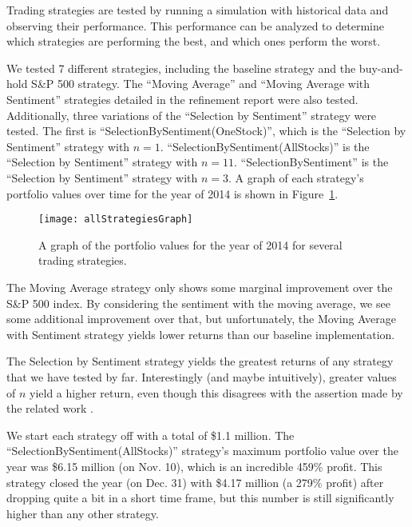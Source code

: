 Trading strategies are tested by running a simulation with historical data and observing their performance.
This performance can be analyzed to determine which strategies are performing the best, and which ones perform the worst.

We tested 7 different strategies, including the baseline strategy and the buy-and-hold S\&P 500 strategy.
The ``Moving Average'' and ``Moving Average with Sentiment'' strategies detailed in the refinement report were also tested.
Additionally, three variations of the ``Selection by Sentiment'' strategy were tested.
The first is ``SelectionBySentiment(OneStock)'', which is the ``Selection by Sentiment'' strategy with $n=1$.
``SelectionBySentiment(AllStocks)'' is the ``Selection by Sentiment'' strategy with $n=11$.
``SelectionBySentiment'' is the ``Selection by Sentiment'' strategy with $n=3$.
A graph of each strategy's portfolio values over time for the year of 2014 is shown in Figure~\ref{allStrategiesGraph}.

\begin{figure}[h]
  \label{allStrategiesGraph}
  \begin{center}
    \texttt{[image: allStrategiesGraph]}
  \end{center}
  \caption{A graph of the portfolio values for the year of 2014 for several trading strategies.}
\end{figure}

The Moving Average strategy only shows some marginal improvement over the S\&P 500 index.
By considering the sentiment with the moving average, we see some additional improvement over that, but unfortunately, the Moving Average with Sentiment strategy yields lower returns than our baseline implementation.

The Selection by Sentiment strategy yields the greatest returns of any strategy that we have tested by far.
Interestingly (and maybe intuitively), greater values of $n$ yield a higher return, even though this disagrees with the assertion made by the related work \cite{tradingSentimentPaper}.

We start each strategy off with a total of \$1.1 million.
The ``SelectionBySentiment(AllStocks)'' strategy’s maximum portfolio value over the year was \$6.15 million (on Nov. 10), which is an incredible 459\% profit.
This strategy closed the year (on Dec. 31) with \$4.17 million (a 279\% profit) after dropping quite a bit in a short time frame, but this number is still significantly higher than any other strategy.

